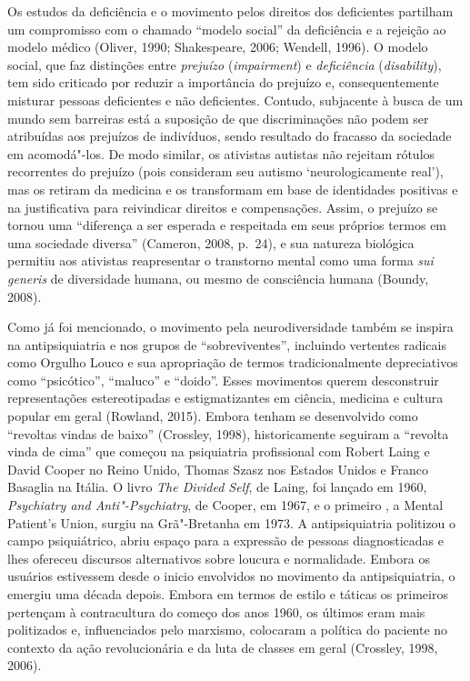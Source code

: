 Os estudos da deficiência e o movimento pelos direitos dos deficientes
partilham um compromisso com o chamado ``modelo social'' da deficiência
e a rejeição ao modelo médico (Oliver, 1990; Shakespeare, 2006; Wendell,
1996). O modelo social, que faz distinções entre \emph{prejuízo}
(\emph{impairment}) e \emph{deficiência} (\emph{disability}), tem sido criticado por
reduzir a importância do prejuízo e, consequentemente misturar pessoas
deficientes e não deficientes. Contudo, subjacente à busca de um mundo
sem barreiras está a suposição de que discriminações não podem ser
atribuídas aos prejuízos de indivíduos, sendo resultado do fracasso da
sociedade em acomodá"-los. De modo similar, os ativistas autistas não
rejeitam rótulos recorrentes do prejuízo (pois consideram seu autismo
`neurologicamente real'), mas os retiram da medicina e os transformam em
base de identidades positivas e na justificativa para reivindicar
direitos e compensações. Assim, o prejuízo se tornou uma ``diferença a
ser esperada e respeitada em seus próprios termos em uma sociedade
diversa'' (Cameron, 2008, p.~24), e sua natureza biológica permitiu aos
ativistas reapresentar o transtorno mental como uma forma \emph{sui
generis} de diversidade humana, ou mesmo de consciência humana (Boundy,
2008).

Como já foi mencionado, o movimento pela neurodiversidade também se
inspira na antipsiquiatria e nos grupos de ``sobreviventes'', incluindo vertentes radicais como
Orgulho Louco e sua apropriação de termos tradicionalmente depreciativos
como ``psicótico'', ``maluco'' e ``doido''. Esses movimentos querem
desconstruir representações estereotipadas e estigmatizantes em ciência,
medicina e cultura popular em geral (Rowland, 2015). Embora tenham se
desenvolvido como ``revoltas vindas de baixo'' (Crossley, 1998),
historicamente seguiram a ``revolta vinda de cima'' que começou na
psiquiatria profissional com Robert Laing e David Cooper no Reino Unido,
Thomas Szasz nos Estados Unidos e Franco Basaglia na Itália. O livro
\emph{The Divided Self}, de Laing, foi lançado em 1960, \emph{Psychiatry
and Anti"-Psychiatry}, de Cooper, em 1967, e o primeiro , a Mental
Patient's Union, surgiu na Grã"-Bretanha em 1973. A antipsiquiatria
politizou o campo psiquiátrico, abriu espaço para a expressão de pessoas
diagnosticadas e lhes ofereceu discursos alternativos sobre loucura e
normalidade. Embora os usuários estivessem desde o inicio envolvidos no
movimento da antipsiquiatria, o  emergiu uma década depois. Embora
em termos de estilo e táticas os primeiros pertençam à contracultura do
começo dos anos 1960, os últimos eram mais politizados e, influenciados
pelo marxismo, colocaram a política do paciente no contexto da ação
revolucionária e da luta de classes em geral (Crossley, 1998, 2006).

